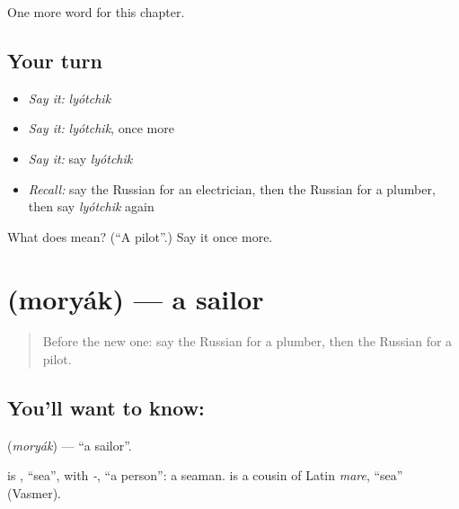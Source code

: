 \begin{grammarlens}[title={What you've built}]
One more word for this chapter.
\end{grammarlens}

\subsection*{Your turn}
\begin{itemize}
\raggedright
  \item \emph{Say it:} \emph{lyótchik}
  \item \emph{Say it:} \emph{lyótchik}, once more
  \item \emph{Say it:} say \emph{lyótchik}
  \item \emph{Recall:} say the Russian for an electrician, then the Russian for a plumber, then say \emph{lyótchik} again
\end{itemize}

\begin{tcolorbox}[breakable,colback=teal!4,colframe=teal!35!black,title={Before you move on}]
What does  mean? (\textquotedblleft{}A pilot\textquotedblright{}.) Say it once more.
\end{tcolorbox}
\section[\texorpdfstring{\ru{моряк} (moryák)}{моряк (moryák)}]{ (moryák) — a sailor}

\label{lesson:RU-C202-moryak}



\begin{quote}
Before the new one: say the Russian for a plumber, then the Russian for a pilot.
\end{quote}

\subsection*{You'll want to know: }
\textbf{} (\emph{moryák}) — \textquotedblleft{}a sailor\textquotedblright{}.

\begin{cousinweb}
\textbf{} is \emph{}, \textquotedblleft{}sea\textquotedblright{}, with \emph{-}, \textquotedblleft{}a person\textquotedblright{}: a seaman. \emph{} is a cousin of Latin \emph{mare}, \textquotedblleft{}sea\textquotedblright{} (Vasmer).
\end{cousinweb}

